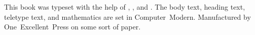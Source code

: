 \begin{colophon}
{}
This book was typeset 
with the help of \LaTeXe, \XeTeX, and \KOMAScript.
The body text, heading text, teletype text, and mathematics are set in Computer~Modern.
Manufactured by One~Excellent~Press on some sort of paper.
\end{colophon}